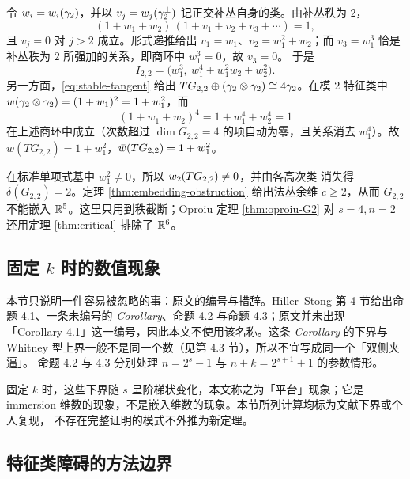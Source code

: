 \begin{example}[$G_{2,2}=G_2(\R^{4})$]\label{ex:G22}
令 $w_i=w_i(\gamma_2)$，并以 $v_j=w_j(\gamma^{\perp}_2)$ 记正交补丛自身的类。由补丛秩为 $2$，
\begin{equation*}
  (1+w_1+w_2)\,(1+v_1+v_2+v_3+\cdots)=1,
\end{equation*}
且 $v_j=0$ 对 $j>2$ 成立。形式递推给出 $v_1=w_1$、$v_2=w_1^{2}+w_2$；而
$v_3=w_1^{3}$ 恰是补丛秩为 $2$ 所强加的关系，即商环中 $w_1^{3}=0$，故 $v_3=0$。
于是
\begin{equation*}
  I_{2,2}=\bigl(w_1^{3},\ w_1^{4}+w_1^{2}w_2+w_2^{2}\bigr).
\end{equation*}
另一方面，\eqref{eq:stable-tangent} 给出
$TG_{2,2}\oplus(\gamma_2\otimes\gamma_2)\cong4\gamma_2$。在模 $2$ 特征类中
$w(\gamma_2\otimes\gamma_2)=(1+w_1)^{2}=1+w_1^{2}$，而
\begin{equation*}
  (1+w_1+w_2)^{4}=1+w_1^{4}+w_2^{4}=1
\end{equation*}
在上述商环中成立（次数超过 $\dim G_{2,2}=4$ 的项自动为零，且关系消去
$w_1^{4}$）。故 $w(TG_{2,2})=1+w_1^{2}$，$\bar w(TG_{2,2})=1+w_1^{2}$。

在标准单项式基中 $w_1^{2}\neq0$，所以 $\bar w_2(TG_{2,2})\neq0$，并由各高次类
消失得 $\delta(G_{2,2})=2$。定理 \ref{thm:embedding-obstruction} 给出法丛余维
$c\ge2$，从而 $G_{2,2}$ 不能嵌入 $\mathbb{R}^{5}$。这里只用到秩截断；Oproiu 定理
\ref{thm:oproiu-G2} 对 $s=4,n=2$ 还用定理 \ref{thm:critical} 排除了 $\mathbb{R}^{6}$。
\end{example}

\subsection{固定 $k$ 时的数值现象}

本节只说明一件容易被忽略的事：原文的编号与措辞。Hiller--Stong 第 4 节给出命题
4.1、一条未编号的 \emph{Corollary}、命题 4.2 与命题 4.3；原文并未出现
「Corollary 4.1」这一编号，因此本文不使用该名称。这条 \emph{Corollary} 的下界与
Whitney 型上界一般不是同一个数（见第 4.3 节），所以不宜写成同一个「双侧夹逼」。
命题 4.2 与 4.3 分别处理 $n=2^{s}-1$ 与 $n+k=2^{s+1}+1$ 的参数情形。

固定 $k$ 时，这些下界随 $s$ 呈阶梯状变化，本文称之为「平台」现象；它是
immersion 维数的现象，不是嵌入维数的现象。本节所列计算均标为文献下界或个人复现，
不存在完整证明的模式不外推为新定理。

\subsection{特征类障碍的方法边界}

